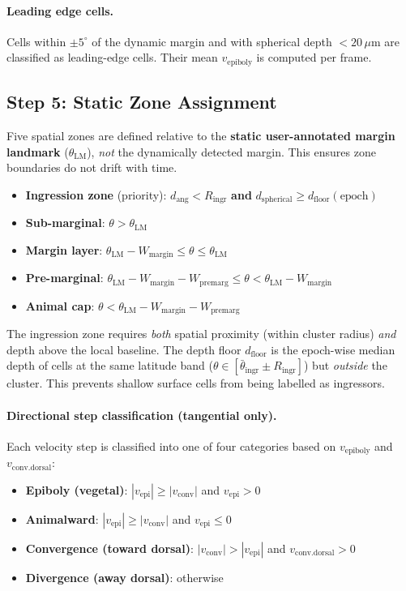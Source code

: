 \documentclass[11pt,a4paper]{article}
\newcommand{\um}{\,\mu\text{m}}
\begin{document}
\paragraph{Leading edge cells.}
Cells within $\pm 5^\circ$ of the dynamic margin and with spherical depth
$< 20\um$ are classified as leading-edge cells.  Their mean
$v_\mathrm{epiboly}$ is computed per frame.

\subsection*{Step 5: Static Zone Assignment}
\label{sec:zones}

Five spatial zones are defined relative to the \textbf{static user-annotated
margin landmark} ($\theta_\mathrm{LM}$), \emph{not} the dynamically detected
margin.  This ensures zone boundaries do not drift with time.

\begin{itemize}[nosep]
  \item \textbf{Ingression zone} (priority):
    $d_\mathrm{ang} < R_\mathrm{ingr}$ \textbf{and}
    $d_\mathrm{spherical} \ge d_\mathrm{floor}(\text{epoch})$
  \item \textbf{Sub-marginal}: $\theta > \theta_\mathrm{LM}$
  \item \textbf{Margin layer}: $\theta_\mathrm{LM} - W_\mathrm{margin}
        \le \theta \le \theta_\mathrm{LM}$
  \item \textbf{Pre-marginal}: $\theta_\mathrm{LM} - W_\mathrm{margin}
        - W_\mathrm{premarg} \le \theta < \theta_\mathrm{LM} - W_\mathrm{margin}$
  \item \textbf{Animal cap}: $\theta < \theta_\mathrm{LM}
        - W_\mathrm{margin} - W_\mathrm{premarg}$
\end{itemize}

The ingression zone requires \emph{both} spatial proximity (within cluster
radius) \emph{and} depth above the local baseline.  The depth floor
$d_\mathrm{floor}$ is the epoch-wise median depth of cells at the same
latitude band ($\theta \in [\bar\theta_\mathrm{ingr} \pm R_\mathrm{ingr}]$)
but \emph{outside} the cluster.  This prevents shallow surface cells from
being labelled as ingressors.

\paragraph{Directional step classification (tangential only).}
Each velocity step is classified into one of four categories based on
$v_\mathrm{epiboly}$ and $v_\mathrm{conv.dorsal}$:
\begin{itemize}[nosep]
  \item \textbf{Epiboly (vegetal)}: $|v_\mathrm{epi}| \ge |v_\mathrm{conv}|$
        and $v_\mathrm{epi} > 0$
  \item \textbf{Animalward}: $|v_\mathrm{epi}| \ge |v_\mathrm{conv}|$
        and $v_\mathrm{epi} \le 0$
  \item \textbf{Convergence (toward dorsal)}:
        $|v_\mathrm{conv}| > |v_\mathrm{epi}|$ and
        $v_\mathrm{conv.dorsal} > 0$
  \item \textbf{Divergence (away dorsal)}: otherwise
\end{itemize}
\end{document}
